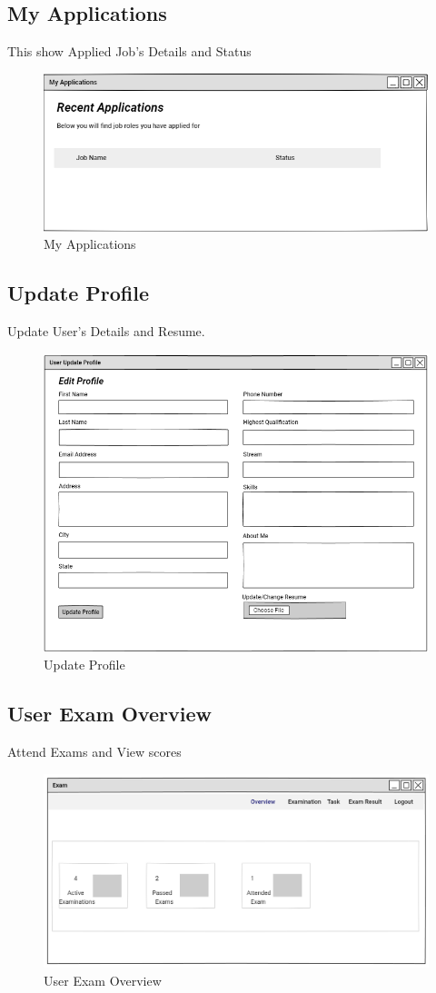 \documentclass[a4paper,12pt]{report}
\begin{document}
\subsection {My Applications}
This show Applied Job's Details and Status
\begin{figure}[bph]
	\centering
	\includegraphics[width=.7\linewidth]{img/user/useraplictns}
	\caption{My Applications}
\end{figure}

\subsection {Update Profile}
Update User's Details and Resume.
\begin{figure}[bph]
	\centering
	\includegraphics[width=.7\linewidth ]{img/user/userupdate}
	\caption{Update Profile}
\end{figure}

\subsection {User Exam Overview}
Attend Exams and View scores
\begin{figure}[bph]
	\centering
	\includegraphics[width=.4\linewidth]{img/user/userexamoverview}
		\caption{User Exam Overview}
\end{figure}
\end{document}

